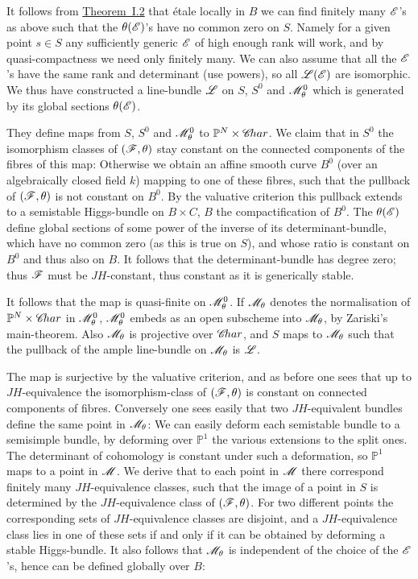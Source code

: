 \documentclass[12pt,english]{smfart}
\theoremstyle{plain} \newtheorem{innerthm}{Theorem} \newtheorem{innerlem}{Lemma} \newtheorem{innerprop}{Proposition} \newtheorem{innercor}{Corollary} \theoremstyle{definition} \newtheorem{innerdefn}{Definition} \newtheorem{innerconstr}{Construction} \theoremstyle{remark} \newtheorem*{remark}{Remark} \newtheorem*{remarks}{Remarks} \newtheorem*{applications}{Applications}
\newcommand{\refthm}[1]{\hyperref[thm:#1]{Theorem~#1}} \newcommand{\reflem}[1]{\hyperref[lem:#1]{Lemma~#1}} \newcommand{\refprop}[1]{\hyperref[prop:#1]{Proposition~#1}} \newcommand{\refcor}[1]{\hyperref[cor:#1]{Corollary~#1}} \newcommand{\refdef}[1]{\hyperref[def:#1]{Definition~#1}} \newcommand{\refconstr}[1]{\hyperref[constr:#1]{Construction~#1}} \newcommand{\refsec}[1]{\hyperref[sec:#1]{\S#1}}
\begin{document}
It follows from \refthm{I.2} that \'etale locally in $B$ we can find finitely many $\mathscr{E}$'s as above such that the $\theta(\mathscr{E})$'s have no common zero on $S$. Namely for a given point $s\in S$ any sufficiently generic $\mathscr{E}$ of high enough rank will work, and by quasi-compactness we need only finitely many. We can also assume that all the $\mathscr{E}$'s have the same rank and determinant (use powers), so all $\mathscr{L}(\mathscr{E})$ are isomorphic. We thus have constructed a line-bundle $\mathscr{L}$ on $S$, $S^0$ and $\mathscr{M}_\theta^0$ which is generated by its global sections $\theta(\mathscr{E})$.

They define maps from $S$, $S^0$ and $\mathscr{M}_\theta^0$ to $\mathbb{P}^N\times\mathscr{C}\!har$. We claim that in $S^0$ the isomorphism classes of $(\mathscr{F},\theta)$ stay constant on the connected components of the fibres of this map: Otherwise we obtain an affine smooth curve $B^0$ (over an algebraically closed field $k$) mapping to one of these fibres, such that the pullback of $(\mathscr{F},\theta)$ is not constant on $B^0$. By the valuative criterion this pullback extends to a semistable Higgs-bundle on $B\times C$, $B$ the compactification of $B^0$. The $\theta(\mathscr{E})$ define global sections of some power of the inverse of its determinant-bundle, which have no common zero (as this is true on $S$), and whose ratio is constant on $B^0$ and thus also on $B$. It follows that the determinant-bundle has degree zero; thus $\mathscr{F}$ must be $JH$-constant, thus constant as it is generically stable.

It follows that the map is quasi-finite on $\mathscr{M}_\theta^0$. If $\mathscr{M}_\theta$ denotes the normalisation of $\mathbb{P}^N\times\mathscr{C}\!har$ in $\mathscr{M}_\theta^0$, $\mathscr{M}_\theta^0$ embeds as an open subscheme into $\mathscr{M}_\theta$, by Zariski's main-theorem. Also $\mathscr{M}_\theta$ is projective over $\mathscr{C}\!har$, and $S$ maps to $\mathscr{M}_\theta$ such that the pullback of the ample line-bundle on $\mathscr{M}_\theta$ is $\mathscr{L}$.

The map is surjective by the valuative criterion, and as before one sees that up to $JH$-equivalence the isomorphism-class of $(\mathscr{F},\theta)$ is constant on connected components of fibres. Conversely one sees easily that
two $JH$-equivalent bundles define the same point in $\mathscr{M}_\theta$: We can easily deform each semistable bundle to a semisimple bundle, by deforming over $\mathbb{P}^1$ the various extensions to the split ones. The determinant of cohomology is constant under such a deformation, so $\mathbb{P}^1$ maps to a point in $\mathscr{M}$. We derive that to each point in $\mathscr{M}$ there correspond finitely many $JH$-equivalence classes, such that the image of a point in $S$ is determined by the $JH$-equivalence class of $(\mathscr{F},\theta)$. For two different points the corresponding sets of $JH$-equivalence classes are disjoint, and a $JH$-equivalence class lies in one of these sets if and only if it can be obtained by deforming a stable Higgs-bundle. It also follows that $\mathscr{M}_\theta$ is independent of the choice of the $\mathscr{E}$'s, hence can be defined globally over $B$:
\end{document}
